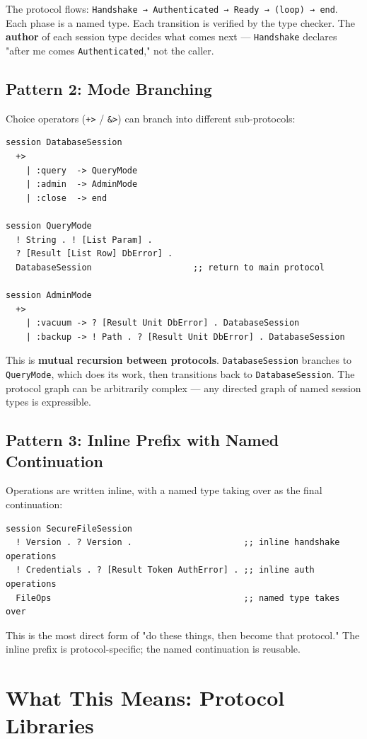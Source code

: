\documentclass[11pt]{article}
\begin{document}
The protocol flows: \texttt{Handshake → Authenticated → Ready → (loop) → end}. Each
phase is a named type. Each transition is verified by the type checker. The
\textbf{author} of each session type decides what comes next --- \texttt{Handshake} declares
"after me comes \texttt{Authenticated}," not the caller.
\subsection{Pattern 2: Mode Branching}
\label{sec:orgc116149}

Choice operators (\texttt{+>} / \texttt{\&>}) can branch into different sub-protocols:

\begin{verbatim}
session DatabaseSession
  +>
    | :query  -> QueryMode
    | :admin  -> AdminMode
    | :close  -> end

session QueryMode
  ! String . ! [List Param] .
  ? [Result [List Row] DbError] .
  DatabaseSession                    ;; return to main protocol

session AdminMode
  +>
    | :vacuum -> ? [Result Unit DbError] . DatabaseSession
    | :backup -> ! Path . ? [Result Unit DbError] . DatabaseSession
\end{verbatim}

This is \textbf{mutual recursion between protocols}. \texttt{DatabaseSession} branches to
\texttt{QueryMode}, which does its work, then transitions back to \texttt{DatabaseSession}.
The protocol graph can be arbitrarily complex --- any directed graph of named
session types is expressible.
\subsection{Pattern 3: Inline Prefix with Named Continuation}
\label{sec:org4b2223c}

Operations are written inline, with a named type taking over as the final
continuation:

\begin{verbatim}
session SecureFileSession
  ! Version . ? Version .                      ;; inline handshake operations
  ! Credentials . ? [Result Token AuthError] . ;; inline auth operations
  FileOps                                      ;; named type takes over
\end{verbatim}

This is the most direct form of "do these things, then become that protocol."
The inline prefix is protocol-specific; the named continuation is reusable.
\section{What This Means: Protocol Libraries}
\label{sec:org5554b17}
\end{document}
